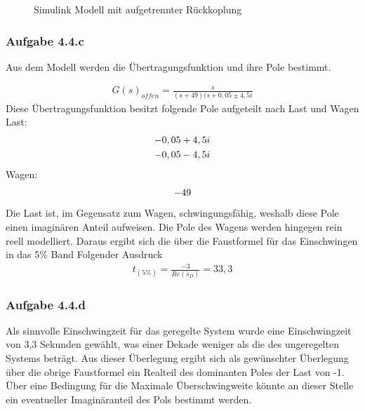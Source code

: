 \documentclass[10pt]{scrartcl}
\begin{document}
\begin{figure} [H]
\caption{Simulink Modell mit aufgetrennter Rückkoplung} 
\end{figure}
\subsubsection{Aufgabe 4.4.c}	
Aus dem Modell werden die Übertragungsfunktion und ihre Pole bestimmt.

\begin{align}
   G(s)_{offen}=\frac{s}{(s+49)(s+0,05\pm4,5i}
\end{align}
Diese Übertragungsfunktion besitzt folgende Pole aufgeteilt nach Last und Wagen\\ 
Last: 
\begin{align}
-0,05+4,5i  \notag \\
-0,05-4,5i  \notag 
\end{align}
Wagen:
\begin{align}
-49  \notag 
\end{align}
Die Last ist, im Gegensatz zum Wagen, schwingungsfähig, weshalb diese Pole einen imaginären Anteil aufweisen. Die Pole des Wagens werden hingegen rein reell modelliert. 
Daraus ergibt sich die über die Faustformel für das Einschwingen in das 5\% Band Folgender Ausdruck
\begin{align}
t_{(5\%)}=\frac{-3}{Re(s_D)}=33,3
\end{align}
\subsubsection{Aufgabe 4.4.d}	
 Als sinnvolle Einschwingzeit für das geregelte System wurde eine Einschwingzeit von  3,3 Sekunden gewählt, was einer Dekade weniger als die des ungeregelten Systems beträgt. Aus dieser Überlegung ergibt sich als gewünschter Überlegung über die obrige Faustformel ein Realteil des dominanten Poles der Last von -1. Über eine Bedingung für die Maximale Überschwingweite könnte an dieser Stelle ein eventueller Imaginäranteil des Pols bestimmt werden.\\ 
\end{document}
